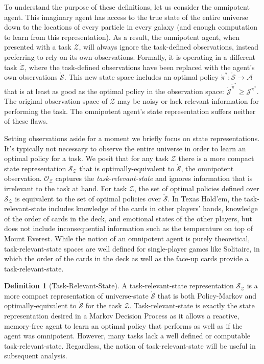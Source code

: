 \documentclass{article} %
\theoremstyle{definition}
\newtheorem{definition}{Definition}[section]
\begin{document}
To understand the purpose of these definitions, let us consider the
omnipotent agent. This imaginary agent has access to the true state of
the entire universe down to the locations of every particle in every
galaxy (and enough computation to learn from this representation). As
a result, the omnipotent agent, when presented with a task
$\mathcal{Z}$, will always ignore the task-defined observations,
instead preferring to rely on its own observations. Formally, it is
operating in a different task $\mathring{\mathcal{Z}}$, where the
task-defined observations have been replaced with the agent's own
observations $\mathring{\mathcal{S}}$. This new state space includes
an optimal policy $\mathring{\pi}^*: \mathring{\mathcal{S}}
\rightarrow \mathcal{A}$ that is at least as good as the optimal
policy in the observation space:
$\mathring{\mathcal{J}}^{\mathring{\pi}^*} \ge
\mathcal{J}^{\pi^*}$. The original observation space of $\mathcal{Z}$
may be noisy or lack relevant information for performing the task. The
omnipotent agent's state representation suffers neither of these
flaws.

Setting observations aside for a moment we briefly focus on state
representations. It's typically not necessary to observe the entire
universe in order to learn an optimal policy for a task. We posit that
for any task $\mathcal{Z}$ there is a more compact state
representation $\mathcal{S}_\mathcal{Z}$ that is optimally-equivalent
to $\mathring{\mathcal{S}}$, the omnipotent
observation. $\mathcal{O}_\mathcal{Z}$ captures the
\textit{task-relevant-state} and ignores information that is
irrelevant to the task at hand. For task $\mathcal{Z}$, the set of
optimal policies defined over $\mathcal{S}_\mathcal{Z}$ is equivalent
to the set of optimal policies over $\mathring{\mathcal{S}}$. In Texas
Hold'em, the task-relevant-state includes knowledge of the cards in
other players' hands, knowledge of the order of cards in the deck, and
emotional states of the other players, but does not include
inconsequential information such as the temperature on top of Mount
Everest. While the notion of an omnipotent agent is purely
theoretical, task-relevant-state spaces are well defined for
single-player games like Solitaire, in which the order of the cards in
the deck as well as the face-up cards provide a task-relevant-state.

\begin{definition}[Task-Relevant-State]
\label{def:taskRelState}
A task-relevant-state representation $\mathcal{S}_\mathcal{Z}$ is a
more compact representation of universe-state $\mathring{\mathcal{S}}$
that is both Policy-Markov and optimally-equivalent to
$\mathring{\mathcal{S}}$ for the task
$\mathcal{Z}$. Task-relevant-state is exactly the state representation
desired in a Markov Decision Process as it allows a reactive,
memory-free agent to learn an optimal policy that performs as well as
if the agent was omnipotent. However, many tasks lack a well defined
or computable task-relevant-state. Regardless, the notion of
task-relevant-state will be useful in subsequent analysis.
\end{definition}
\end{document}
